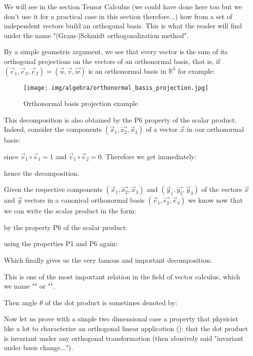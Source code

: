 	\begin{tcolorbox}[title=Remark,colframe=black,arc=10pt]
	We will see in the section Tensor Calculus (we could have done here too but we don't use it for a practical case in this section therefore...) how from a set of independent vectors build an orthogonal basis. This is what the reader will find under the name  "(Gram-)Schmidt orthogonalization method".
	\end{tcolorbox}	
	By a simple geometric argument, we see that every vector is the sum of its orthogonal projections on the vectors of an orthonormal basis, that is, if $(\vec{e}_1,\vec{e}_2,\vec{e}_2)=(\vec{u},\vec{v},\vec{w})$ is an orthonormal basis in $\mathbb{R}^3$ for example:
	
	\begin{figure}[H]
		\centering
		\texttt{[image: img/algebra/orthonormal\_basis\_projection.jpg]}
		\caption{Orthonormal basis projection example}
	\end{figure}
	This decomposition is also obtained by the P6 property of the scalar product. Indeed, consider the components $(\vec{x}_1,\vec{x_2},\vec{x}_3)$ of a vector $\vec{x}$ in our orthonormal basis:
	
	since $\vec{e}_1\circ\vec{e}_1=1$ and $\vec{e}_1\circ\vec{e}_2=0$. Therefore we get immediately:
	
	hence the decomposition.
	
	Given the respective components $(\vec{x}_1,\vec{x_2},\vec{x}_3)$ and $(\vec{y}_1,\vec{y_2},\vec{y}_3)$ of the vectors  $\vec{x}$ and $\vec{y}$ vectors in a canonical orthonormal basis $(\vec{e}_1,\vec{e_2},\vec{e}_3)$ we know now that we can write the scalar product in the form:
	
	by the property P6 of the scalar product:
	
	using the properties P1 and P6 again:
	
	Which finally gives us the very famous and important decomposition:
	
	This is one of the most important relation in the field of vector calculus, which we name "" or "".
	
	\begin{tcolorbox}[title=Remark,colframe=black,arc=10pt]
	Then angle $\theta$ of the dot product is sometimes denoted by:
	
	\end{tcolorbox}
	Now let us prove with a simple two dimensional case a property that physicist like a lot to characterize an orthogonal linear application (): that the dot product is invariant under any orthogonal transformation (then abusively said "invariant under basis change...").

